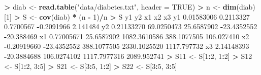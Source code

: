 \documentclass[
  a4paper,
  oneside]{scrbook}
\newenvironment{Shaded}{\begin{snugshade}}{\end{snugshade}}
\newcommand{\AttributeTok}[1]{\textcolor[rgb]{0.13,0.29,0.53}{#1}}
\newcommand{\ConstantTok}[1]{\textcolor[rgb]{0.56,0.35,0.01}{#1}}
\newcommand{\DecValTok}[1]{\textcolor[rgb]{0.00,0.00,0.81}{#1}}
\newcommand{\FloatTok}[1]{\textcolor[rgb]{0.00,0.00,0.81}{#1}}
\newcommand{\FunctionTok}[1]{\textcolor[rgb]{0.13,0.29,0.53}{\textbf{#1}}}
\newcommand{\NormalTok}[1]{#1}
\newcommand{\OtherTok}[1]{\textcolor[rgb]{0.56,0.35,0.01}{#1}}
\newcommand{\SpecialCharTok}[1]{\textcolor[rgb]{0.81,0.36,0.00}{\textbf{#1}}}
\newcommand{\StringTok}[1]{\textcolor[rgb]{0.31,0.60,0.02}{#1}}
\theoremstyle{definition}
\theoremstyle{definition}
\theoremstyle{definition}
\theoremstyle{definition}
\theoremstyle{remark}
\begin{document}
\begin{Shaded}
\begin{Highlighting}[]
\SpecialCharTok{\textgreater{}}\NormalTok{ diab }\OtherTok{\textless{}{-}} \FunctionTok{read.table}\NormalTok{(}\StringTok{"data/diabetes.txt"}\NormalTok{, }\AttributeTok{header =} \ConstantTok{TRUE}\NormalTok{)}
\SpecialCharTok{\textgreater{}}\NormalTok{ n }\OtherTok{\textless{}{-}} \FunctionTok{dim}\NormalTok{(diab)[}\DecValTok{1}\NormalTok{]}
\SpecialCharTok{\textgreater{}}\NormalTok{ S }\OtherTok{\textless{}{-}} \FunctionTok{cov}\NormalTok{(diab) }\SpecialCharTok{*}\NormalTok{ (n }\SpecialCharTok{{-}} \DecValTok{1}\NormalTok{)}\SpecialCharTok{/}\NormalTok{n}
\SpecialCharTok{\textgreater{}}\NormalTok{ S}
\NormalTok{            y1          y2           x1           x2          x3}
\NormalTok{y1  }\FloatTok{0.01583006}   \FloatTok{0.2113327}    \FloatTok{0.7700567}   \SpecialCharTok{{-}}\FloatTok{0.2091966}    \FloatTok{2.141484}
\NormalTok{y2  }\FloatTok{0.21133270}  \FloatTok{69.0250473}   \FloatTok{25.6587902}  \SpecialCharTok{{-}}\FloatTok{23.4352552}  \SpecialCharTok{{-}}\FloatTok{20.388469}
\NormalTok{x1  }\FloatTok{0.77005671}  \FloatTok{25.6587902} \FloatTok{1082.3610586}  \FloatTok{388.1077505}  \FloatTok{106.027410}
\NormalTok{x2 }\SpecialCharTok{{-}}\FloatTok{0.20919660} \SpecialCharTok{{-}}\FloatTok{23.4352552}  \FloatTok{388.1077505} \FloatTok{2330.1025520} \FloatTok{1117.797732}
\NormalTok{x3  }\FloatTok{2.14148393} \SpecialCharTok{{-}}\FloatTok{20.3884688}  \FloatTok{106.0274102} \FloatTok{1117.7977316} \FloatTok{2089.952741}
\SpecialCharTok{\textgreater{}}\NormalTok{ S11 }\OtherTok{\textless{}{-}}\NormalTok{ S[}\DecValTok{1}\SpecialCharTok{:}\DecValTok{2}\NormalTok{, }\DecValTok{1}\SpecialCharTok{:}\DecValTok{2}\NormalTok{]}
\SpecialCharTok{\textgreater{}}\NormalTok{ S12 }\OtherTok{\textless{}{-}}\NormalTok{ S[}\DecValTok{1}\SpecialCharTok{:}\DecValTok{2}\NormalTok{, }\DecValTok{3}\SpecialCharTok{:}\DecValTok{5}\NormalTok{]}
\SpecialCharTok{\textgreater{}}\NormalTok{ S21 }\OtherTok{\textless{}{-}}\NormalTok{ S[}\DecValTok{3}\SpecialCharTok{:}\DecValTok{5}\NormalTok{, }\DecValTok{1}\SpecialCharTok{:}\DecValTok{2}\NormalTok{]}
\SpecialCharTok{\textgreater{}}\NormalTok{ S22 }\OtherTok{\textless{}{-}}\NormalTok{ S[}\DecValTok{3}\SpecialCharTok{:}\DecValTok{5}\NormalTok{, }\DecValTok{3}\SpecialCharTok{:}\DecValTok{5}\NormalTok{]}
\end{Highlighting}
\end{Shaded}

\normalsize
\end{document}

